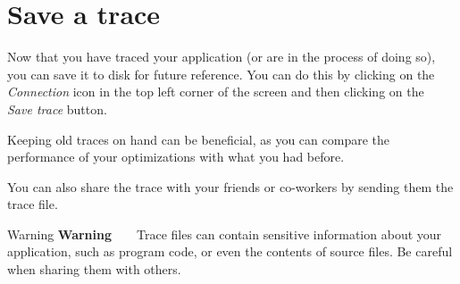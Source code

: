 \chapter{Save a trace }
\hypertarget{md__mono_engine_2thirdparty_2tracy_2profiler_2src_2achievements_2_save_trace}{}\label{md__mono_engine_2thirdparty_2tracy_2profiler_2src_2achievements_2_save_trace}
\label{md__mono_engine_2thirdparty_2tracy_2profiler_2src_2achievements_2_save_trace_autotoc_md1114}%
%


Now that you have traced your application (or are in the process of doing so), you can save it to disk for future reference. You can do this by clicking on the {\itshape  Connection} icon in the top left corner of the screen and then clicking on the {\itshape  Save trace} button.

Keeping old traces on hand can be beneficial, as you can compare the performance of your optimizations with what you had before.

You can also share the trace with your friends or co-\/workers by sending them the trace file.

\begin{DoxyWarning}{Warning}
{\bfseries{Warning}} ~\newline
~\newline
 Trace files can contain sensitive information about your application, such as program code, or even the contents of source files. Be careful when sharing them with others. 
\end{DoxyWarning}
